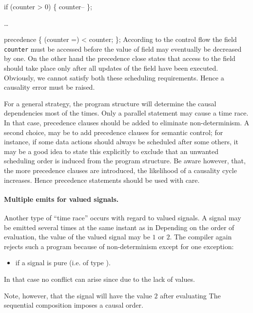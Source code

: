 if (counter > 0) \{ counter-- \};

\ldots

precedence \{
    (counter =) < counter;
\};
\EEP
% 
According to the control flow the field \texttt{counter} must be accessed before the value of field may eventually be decreased by one. On the other
hand the precedence close states that access to the field should take place
only after all updates of the field have been executed. Obviously, we cannot
satisfy both these scheduling requirements. Hence a causality error must be
raised.

For a general strategy, the program structure will determine the 
causal dependencies most of the times. Only a parallel statement may 
cause a time race. In that case, precedence clauses should be added to 
eliminate non-determinism. A second choice, may be to add precedence 
clauses for semantic control; for instance, if some data actions 
should always be scheduled after some others, it may be a good idea 
to 
state this explicitly to exclude that an unwanted scheduling order is induced 
from the program structure. Be aware however, that, the more precedence 
clauses are introduced, the likelihood of a causality cycle 
increases. 
Hence precedence statements should be used with care. 


\paragraph{Multiple emits for valued signals.}\label{timeraces}
Another type of ``time race'' occurs with regard to valued signals.
A signal may be emitted several times at the same instant as in
%
%
Depending on the order of evaluation, the value of the valued signal
 may be $1$ or $2$.  The compiler again rejects such a program
because of non-determinism except for one exception:
\begin{itemize}
	\item  if a signal is pure (i.e. of type ).
\end{itemize}
In that case no conflict can arise since due to the lack of values.

Note, however, that the signal  will have the value $2$ after 
evaluating
%
%
The sequential composition imposes a causal order. 

